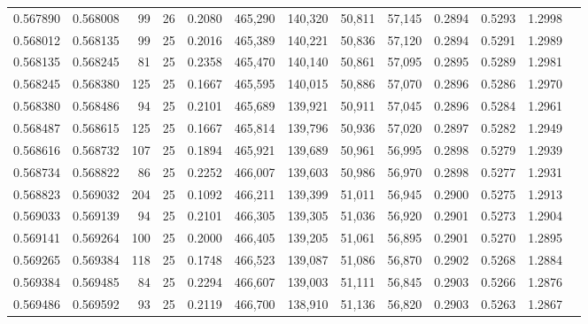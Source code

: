 \begin{tabular}{rrrrrrrrrrrrr}
0.567890 & 0.568008 &    99 &  26 &                                     0.2080 & 465,290 & 140,320 &  50,811 &  57,145 & 0.2894 & 0.5293 & 1.2998 \\
0.568012 & 0.568135 &    99 &  25 &                                     0.2016 & 465,389 & 140,221 &  50,836 &  57,120 & 0.2894 & 0.5291 & 1.2989 \\
0.568135 & 0.568245 &    81 &  25 &                                     0.2358 & 465,470 & 140,140 &  50,861 &  57,095 & 0.2895 & 0.5289 & 1.2981 \\
0.568245 & 0.568380 &   125 &  25 &                                     0.1667 & 465,595 & 140,015 &  50,886 &  57,070 & 0.2896 & 0.5286 & 1.2970 \\
0.568380 & 0.568486 &    94 &  25 &                                     0.2101 & 465,689 & 139,921 &  50,911 &  57,045 & 0.2896 & 0.5284 & 1.2961 \\
0.568487 & 0.568615 &   125 &  25 &                                     0.1667 & 465,814 & 139,796 &  50,936 &  57,020 & 0.2897 & 0.5282 & 1.2949 \\
0.568616 & 0.568732 &   107 &  25 &                                     0.1894 & 465,921 & 139,689 &  50,961 &  56,995 & 0.2898 & 0.5279 & 1.2939 \\
0.568734 & 0.568822 &    86 &  25 &                                     0.2252 & 466,007 & 139,603 &  50,986 &  56,970 & 0.2898 & 0.5277 & 1.2931 \\
0.568823 & 0.569032 &   204 &  25 &                                     0.1092 & 466,211 & 139,399 &  51,011 &  56,945 & 0.2900 & 0.5275 & 1.2913 \\
0.569033 & 0.569139 &    94 &  25 &                                     0.2101 & 466,305 & 139,305 &  51,036 &  56,920 & 0.2901 & 0.5273 & 1.2904 \\
0.569141 & 0.569264 &   100 &  25 &                                     0.2000 & 466,405 & 139,205 &  51,061 &  56,895 & 0.2901 & 0.5270 & 1.2895 \\
0.569265 & 0.569384 &   118 &  25 &                                     0.1748 & 466,523 & 139,087 &  51,086 &  56,870 & 0.2902 & 0.5268 & 1.2884 \\
0.569384 & 0.569485 &    84 &  25 &                                     0.2294 & 466,607 & 139,003 &  51,111 &  56,845 & 0.2903 & 0.5266 & 1.2876 \\
0.569486 & 0.569592 &    93 &  25 &                                     0.2119 & 466,700 & 138,910 &  51,136 &  56,820 & 0.2903 & 0.5263 & 1.2867 \\

\end{tabular}
